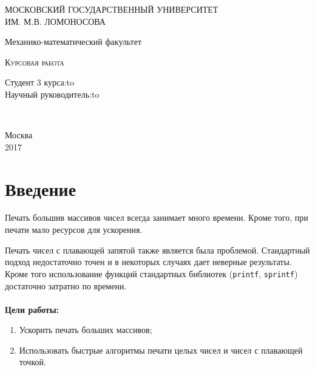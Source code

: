 \documentclass[12pt]{extarticle}
\begin{document}
\begin{titlepage} \newpage 
\begin{center} МОСКОВСКИЙ ГОСУДАРСТВЕННЫЙ УНИВЕРСИТЕТ\\ ИМ. М.В. ЛОМОНОСОВА\end{center} 
\vspace{8em} \begin{center} 
\Large Механико-математический факультет \\ \end{center}
\vspace{2em} \begin{center} 
\textsc{Курсовая работа \linebreak \textbf{}
\linebreak \linebreak \textbf{}} \end{center}
\vspace{6em} \newbox{\lbox}  
\newlength{\maxl} \setlength{\maxl}{\wd\lbox} \hfill\parbox{12	cm}
{ \hspace*{10cm}\hspace*{-5cm}Студент 3 курса:\hfill\hbox to\\
\hspace*{10cm}\hspace*{-5cm}Научный руководитель:\hfill\hbox to}\\  \vspace{\fill}
\begin{center} Москва \\ 2017\end{center} \end{titlepage}


\tableofcontents

\renewcommand{\figurename}{Рисунок}

\newpage

\section*{Введение}
Печать большив массивов чисел всегда занимает много времени.
Кроме того, при печати мало ресурсов для ускорения.

Печать чисел с плавающей запятой также является была проблемой. 
Стандартный подход недостаточно точен и в некоторых случаях дает неверные результаты. 
Кроме того использование функций стандартных библиотек (\texttt{printf}, \texttt{sprintf}) достаточно затратно по времени.
\\
\\
\textbf{Цели работы:}
\begin{enumerate}
\item Ускорить печать больших массивов;
\item Использовать быстрые алгоритмы печати целых чисел и чисел с плавающей точкой.
\end{enumerate}
\end{document}
